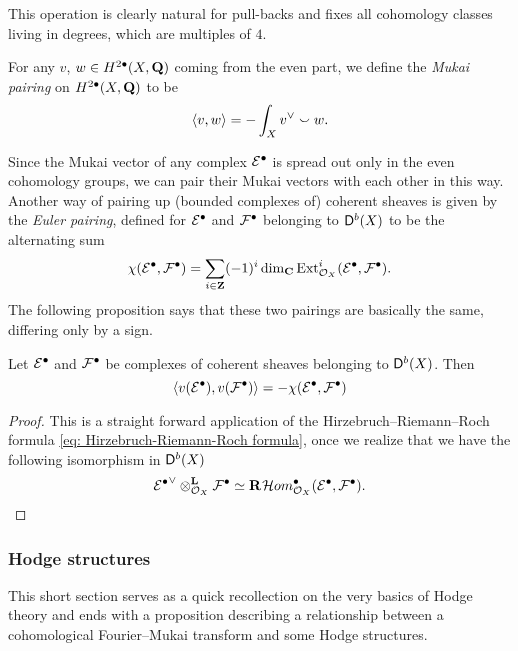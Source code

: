 This operation is clearly natural for pull-backs and fixes all cohomology classes living in degrees, which are multiples of $4$.  

\begin{definition}
    \label{Definition of Mukai pairing}
    For any $v$, $w \in H^{2\bullet}(X, \mathbf Q)$ coming from the even part, we define the \emph{Mukai pairing} on $H^{2\bullet}(X, \mathbf Q)$ to be
    \[
        \langle v, w \rangle = - \int_X v^\vee \smallsmile w.
    \]
\end{definition}

Since the Mukai vector of any complex $\mathcal E^\bullet$ is spread out only in the even cohomology groups, we can pair their Mukai vectors with each other in this way. Another way of pairing up (bounded complexes of) coherent sheaves is given by the \emph{Euler pairing}, defined for $\mathcal E^\bullet$ and $\mathcal F^\bullet$ belonging to $\mathsf{D}^b(X)$ to be the alternating sum
\begin{equation}
    \label{Euler pairing}
    \chi(\mathcal E^\bullet, \mathcal F^\bullet) = \sum_{i \in \mathbf Z} (-1)^i \dim_\mathbf C \operatorname{Ext}^i_{\mathcal{O}_{X}}(\mathcal E^\bullet, \mathcal F^\bullet).
\end{equation}
The following proposition says that these two pairings are basically the same, differing only by a sign. 

\begin{proposition}
    Let $\mathcal E^\bullet$ and $\mathcal F^\bullet$ be complexes of coherent sheaves belonging to $\mathsf{D}^b(X)$. Then
    \[
        \langle v(\mathcal E^\bullet), v(\mathcal F^\bullet) \rangle = -\chi(\mathcal E^\bullet, \mathcal F^\bullet)
    \]
\end{proposition}

\begin{proof}
    This is a straight forward application of the Hirzebruch--Riemann--Roch formula \eqref{eq: Hirzebruch-Riemann-Roch formula}, once we realize that we have the following isomorphism in $\mathsf{D}^b(X)$
    \[
        {\E^\bullet}^\vee \derivedtensor{}{}{\struct{X}} \F^\bullet \iso \rderived{}{\localhom[X]^\bullet(\E^\bullet, \F^\bullet)}.
    \]
\end{proof}

\subsubsection*{Hodge structures}

This short section serves as a quick recollection on the very basics of Hodge theory and ends with a proposition describing a relationship between a cohomological Fourier--Mukai transform and some Hodge structures. 

